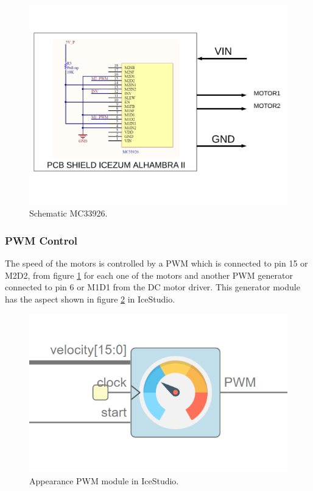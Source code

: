 \begin{figure}[H]
	\center
	\includegraphics[trim = 0mm 3cm 0mm 2cm, clip,scale=0.4]{imagenes/Balancing_robot/driver_motor.pdf}
	\caption{Schematic MC33926.}
	\label{fig:driver_motor}
\end{figure}




\subsubsection{PWM Control}

The speed of the motors is controlled by a PWM which is connected to pin 15 or M2D2, from figure \ref{fig:driver_motor} for each one of the motors and another PWM generator connected to pin 6 or M1D1 from the DC motor driver. This generator module has the aspect shown in figure \ref{fig:pwm_module} in IceStudio. 

\begin{figure}[H]
	\center
	\includegraphics[scale=0.5]{imagenes/Balancing_robot/PWM_module.PNG}
	\caption{Appearance PWM module in IceStudio.}
	\label{fig:pwm_module}
\end{figure}

